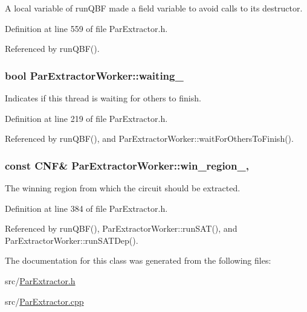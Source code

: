 A local variable of run\-Q\-B\-F made a field variable to avoid calls to its destructor. 



Definition at line 559 of file Par\-Extractor.\-h.



Referenced by run\-Q\-B\-F().

\hypertarget{classParExtractorWorker_aad63a07af4e70719e53a4c41d67b6dd1}{
\subsubsection[{waiting\-\_\-}]{\setlength{\rightskip}{0pt plus 5cm}bool Par\-Extractor\-Worker\-::waiting\-\_\-\hspace{0.3cm}{\ttfamily [inherited]}}}\label{classParExtractorWorker_aad63a07af4e70719e53a4c41d67b6dd1}


Indicates if this thread is waiting for others to finish. 



Definition at line 219 of file Par\-Extractor.\-h.



Referenced by run\-Q\-B\-F(), and Par\-Extractor\-Worker\-::wait\-For\-Others\-To\-Finish().

\hypertarget{classParExtractorWorker_abccf0d629d4dca3a94cc572130e6d0e9}{
\subsubsection[{win\-\_\-region\-\_\-}]{\setlength{\rightskip}{0pt plus 5cm}const {\bf C\-N\-F}\& Par\-Extractor\-Worker\-::win\-\_\-region\-\_\-\hspace{0.3cm}{\ttfamily [protected]}, {\ttfamily [inherited]}}}\label{classParExtractorWorker_abccf0d629d4dca3a94cc572130e6d0e9}


The winning region from which the circuit should be extracted. 



Definition at line 384 of file Par\-Extractor.\-h.



Referenced by run\-Q\-B\-F(), Par\-Extractor\-Worker\-::run\-S\-A\-T(), and Par\-Extractor\-Worker\-::run\-S\-A\-T\-Dep().



The documentation for this class was generated from the following files\-:\begin{DoxyCompactItemize}
\item 
src/\hyperlink{ParExtractor_8h}{Par\-Extractor.\-h}\item 
src/\hyperlink{ParExtractor_8cpp}{Par\-Extractor.\-cpp}\end{DoxyCompactItemize}
